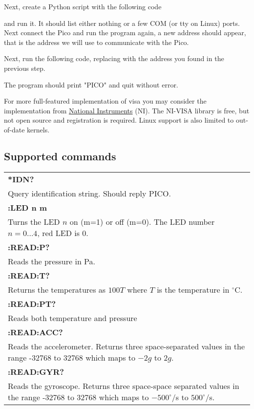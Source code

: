 Next, create a Python script  with the following code

and run it. It should list either nothing or a few COM (or tty on Linux) ports. Next connect the Pico and run the program again, a new address should appear, that is the address we will use to communicate with the Pico.

Next, run the following code, replacing  with the address you found in the previous step.

The program should print "PICO" and quit without error.

For more full-featured implementation of visa you may consider the implementation from \href{https://www.ni.com/en/support/downloads/drivers/download.ni-visa.html#548367}{National Instruments} (NI). The NI-VISA library is free, but not open source and registration is required. Linux support is also limited to out-of-date kernels.

\subsection{Supported commands}
\begin{tabular}{p{15cm}}
    \textbf{*IDN?}\\
    Query identification string. Should reply PICO.
    \\\hline
    \textbf{:LED n m}\\
    Turns the LED $n$ on (m=1) or off (m=0). The LED number $n = 0 \dots 4$, red LED is 0.
    \\\hline
    \textbf{:READ:P?}\\
    Reads the pressure in Pa.
    \\\hline
    \textbf{:READ:T?}\\
    Returns the temperatures as $100T$ where $T$ is the temperature in $^\circ$C.
    \\\hline
    \textbf{:READ:PT?}\\
    Reads both temperature and pressure
    \\\hline
    \textbf{:READ:ACC?}\\
    Reads the accelerometer. Returns three space-separated values in the range -32768 to 32768 which maps to $-2g$ to $2g$.
    \\\hline
    \textbf{:READ:GYR?}\\
    Reads the gyroscope. Returns three space-space separated values in the range -32768 to 32768 which maps to $-500^\circ$/s to $500^\circ$/s.
\end{tabular}

